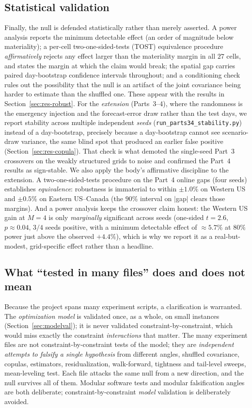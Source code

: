 \documentclass[12pt]{article}
\begin{document}
\subsection{Statistical validation}
Finally, the null is defended statistically rather than merely asserted. A power
analysis reports the minimum detectable effect (an order of magnitude below
materiality); a per-cell two-one-sided-tests (TOST) equivalence procedure
\emph{affirmatively} rejects any effect larger than the materiality margin in all
$27$ cells, and states the margin at which the claim would break; the spatial gap
carries paired day-bootstrap confidence intervals throughout; and a conditioning
check rules out the possibility that the null is an artifact of the joint covariance
being harder to estimate than the shuffled one. These appear with the results in
Section~\ref{sec:res-robust}. For the \emph{extension} (Parts~3--4), where the
randomness is the emergency injection and the forecast-error draw rather than the test
days, we report stability across multiple independent \emph{seeds}
(\texttt{run\_parts34\_stability.py}) instead of a day-bootstrap, precisely because a
day-bootstrap cannot see scenario-draw variance, the same blind spot that produced an
earlier false positive (Section~\ref{sec:res-copula}). That check is what demoted the
single-seed Part~3 crossovers on the weakly structured grids to noise and confirmed the
Part~4 results as sign-stable. We also apply the body's affirmative discipline to the
extension. A two-one-sided-tests procedure on the Part~4 online gaps (four seeds)
establishes \emph{equivalence}: robustness is immaterial to within $\pm1.0\%$ on
Western US and $\pm0.5\%$ on Eastern US--Canada (the $90\%$ interval on $\lvert$gap$
\rvert$ clears those margins). And a power analysis keeps the crossover claim honest:
the Western US gain at $M=4$ is only \emph{marginally} significant across seeds
(one-sided $t=2.6$, $p\approx0.04$, $3/4$ seeds positive, with a minimum detectable
effect of $\approx5.7\%$ at $80\%$ power just above the observed $+4.4\%$), which is
why we report it as a real-but-modest, grid-specific effect rather than a headline.

\subsection{What ``tested in many files'' does and does not mean}
Because the project spans many experiment scripts, a clarification is warranted. The
\emph{optimization model} is validated once, as a whole, on small instances
(Section~\ref{sec:modelval}); it is never validated constraint-by-constraint, which
would miss exactly the constraint \emph{interactions} that matter. The many
experiment files are not constraint-by-constraint tests of the model; they are
\emph{independent attempts to falsify a single hypothesis} from different angles,
shuffled covariance, copulas, estimators, residualization, walk-forward, tightness
and tail-level sweeps, mean-leveling test. Each file attacks the same null from a new
direction, and the null survives all of them. Modular software tests and modular
falsification angles are both deliberate; constraint-by-constraint \emph{model}
validation is deliberately avoided.
\end{document}
